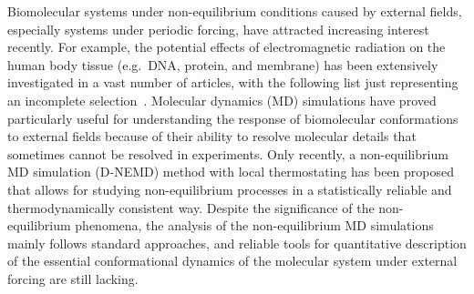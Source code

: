 \documentclass[aps, pre, preprint,unsortedaddress,a4paper,onecolumn,showkeys]{revtex4}
\begin{document}
Biomolecular systems under non-equilibrium conditions caused by external fields, especially
systems under periodic forcing, have attracted increasing
interest recently.  For example, the potential effects of electromagnetic
radiation on the human body tissue (e.g.~DNA, protein, and membrane)  has been extensively
investigated in a vast number of articles, with the following list just representing an incomplete selection~\cite{bohr2000microwave, bohr2000microwave-1, dePomerai2000cell,
  dePomerai2003microwave, mancinelli2004non, inskip2001cellular, bekard2013electric, budi2005electric,
  budi2007effect, budi2008comparative, astrakas2012structural,
  damm2012can, english2009nonequilibrium, solomentsev2012effects}.  Molecular dynamics (MD) simulations have proved particularly useful for understanding
the response of biomolecular conformations to external fields because of their ability to  resolve molecular
details that sometimes cannot be resolved in experiments. Only
recently, a non-equilibrium MD simulation (D-NEMD) method with local thermostating has been proposed~\cite{wang2014exploring} that allows for studying 
non-equilibrium processes in a statistically reliable and thermodynamically consistent way. 
Despite the significance of the non-equilibrium phenomena, the
analysis of the non-equilibrium MD simulations mainly follows standard approaches, and reliable tools for quantitative description of
the essential conformational dynamics of the molecular system under external forcing are still lacking. 

\end{document}
